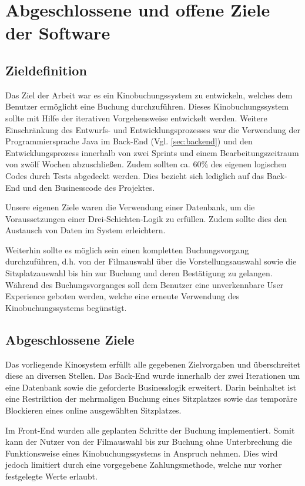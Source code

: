 \section{Abgeschlossene und offene Ziele der Software}
\multipleauthorsection{\authorRF}{\authorEJ}
\label{sec:ziele}
\subsection{Zieldefinition}
Das Ziel der Arbeit war es ein Kinobuchungssystem zu entwickeln, welches dem Benutzer ermöglicht eine Buchung durchzuführen.
Dieses Kinobuchungssystem sollte mit Hilfe der iterativen Vorgehensweise entwickelt werden.
Weitere Einschränkung des Entwurfs- und Entwicklungsprozesses war die Verwendung der Programmiersprache Java im Back-End (Vgl. \vref{sec:backend}) und den Entwicklungsprozess innerhalb von zwei Sprints und einem Bearbeitungszeitraum von zwölf Wochen abzuschließen.
Zudem sollten ca. 60\% des eigenen logischen Codes durch Tests abgedeckt werden. Dies bezieht sich lediglich auf das Back-End und den Businesscode des Projektes.

Unsere eigenen Ziele waren die Verwendung einer Datenbank, um die Voraussetzungen einer Drei-Schichten-Logik zu erfüllen.
Zudem sollte dies den Austausch von Daten im System erleichtern.

Weiterhin sollte es möglich sein einen kompletten Buchungsvorgang durchzuführen, d.h. von der Filmauswahl über die Vorstellungsauswahl sowie die Sitzplatzauswahl bis hin zur Buchung und deren Bestätigung zu gelangen.
Während des Buchungsvorganges soll dem Benutzer eine unverkennbare User Experience geboten werden, welche eine erneute Verwendung des Kinobuchungssystems begünstigt.

\subsection{Abgeschlossene Ziele}
Das vorliegende Kinosystem erfüllt alle gegebenen Zielvorgaben und überschreitet diese an diversen Stellen.
Das Back-End wurde innerhalb der zwei Iterationen um eine Datenbank sowie die geforderte Businesslogik erweitert. Darin beinhaltet ist eine Restriktion der mehrmaligen Buchung eines Sitzplatzes sowie das temporäre Blockieren eines online ausgewählten Sitzplatzes.

Im Front-End wurden alle geplanten Schritte der Buchung implementiert. Somit kann der Nutzer von der Filmauswahl bis zur Buchung ohne Unterbrechung die Funktionsweise eines Kinobuchungssystems in Anspruch nehmen. Dies wird jedoch limitiert durch eine vorgegebene Zahlungsmethode, welche nur vorher festgelegte Werte erlaubt.

